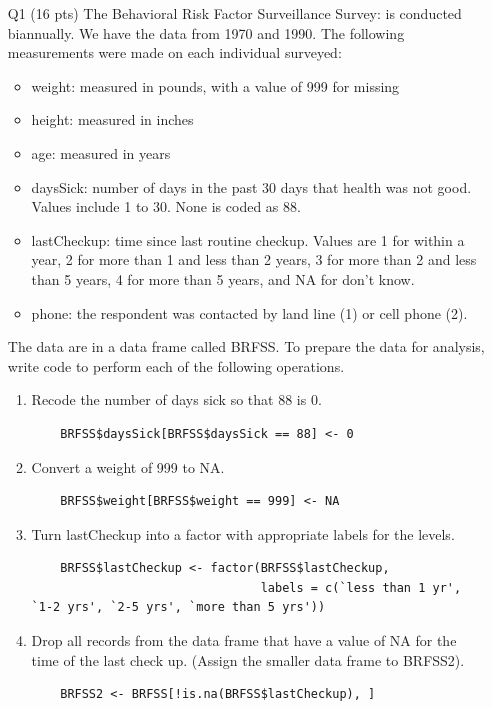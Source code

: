 \documentclass[12pt]{article}
\theoremstyle{Conjecture}
\theoremstyle{example}
\theoremstyle{remark}
\theoremstyle{lemma}
\theoremstyle{definition}
\theoremstyle{corol}
\theoremstyle{proposition}
\theoremstyle{condition}
\begin{document}
\begin{enumerate}

 \item[Q1] 
(16 pts) The Behavioral Risk Factor Surveillance Survey: is conducted
biannually. We have the data from 1970 and 1990. The following
measurements were made on each individual surveyed:
\begin{itemize}
\item weight: measured in pounds, with a value of 999 for missing
\item height: measured in inches
\item age: measured in years
\item daysSick: number of days in the past 30 days that health was not good. Values include 1 to 30. None is coded as 88.
\item lastCheckup: time since last routine checkup. Values are 1 for within a year, 2 for more than 1 and less than 2 years, 3 for more than 2 and less than 5 years, 4 for more than 5 years, and NA for don’t know.
\item phone: the respondent was contacted by land line (1) or cell
  phone (2).
\end{itemize}

The data are in a data frame called BRFSS. To prepare the data for
analysis, write code to perform each of the following operations. 
\begin{enumerate}%
\item Recode the number of days sick so that 88 is 0.
\begin{verbatim}
	BRFSS$daysSick[BRFSS$daysSick == 88] <- 0
\end{verbatim}
\vspace{0.4in}
\item Convert a weight of 999 to NA.
\begin{verbatim}
	BRFSS$weight[BRFSS$weight == 999] <- NA
\end{verbatim}
\vspace{0.4in}
\item Turn lastCheckup into a factor with appropriate labels for the levels.
\begin{verbatim}
	BRFSS$lastCheckup <- factor(BRFSS$lastCheckup,
								labels = c(`less than 1 yr', `1-2 yrs', `2-5 yrs', `more than 5 yrs'))
\end{verbatim}
\vspace{0.4in}
\item Drop all records from the data frame that have a value of NA for the time of the last check up. (Assign the smaller data frame to BRFSS2).
\begin{verbatim}
	BRFSS2 <- BRFSS[!is.na(BRFSS$lastCheckup), ]
\end{verbatim}
\end{enumerate}


\end{enumerate}
\end{document}

